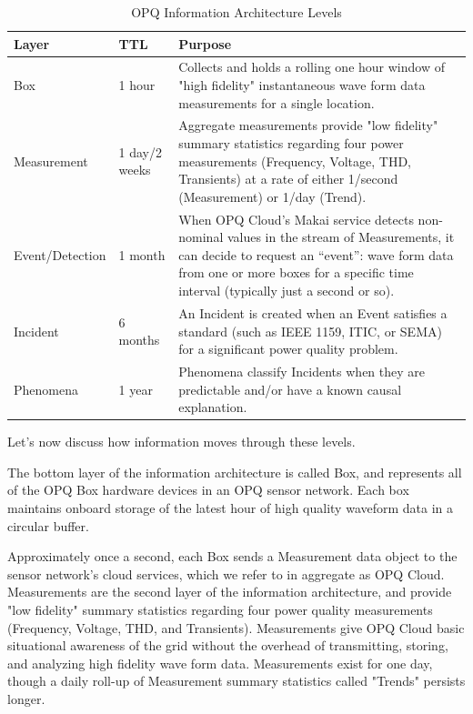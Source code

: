 \begin{table}[ht]
\caption{OPQ Information Architecture Levels}
\centering
\begin{tabular}{llp{4in}}
\toprule
\textbf{Layer}	& \textbf{TTL}	& \textbf{Purpose}\\
\midrule
Box		& 1 hour			& Collects and holds a rolling one hour window of "high fidelity" instantaneous wave form data measurements for a single location.\\
Measurement		& 1 day/2 weeks		& Aggregate measurements provide "low fidelity" summary statistics regarding four power measurements (Frequency, Voltage, THD, Transients) at a rate of either 1/second (Measurement) or 1/day (Trend). \\
Event/Detection & 1 month & When OPQ Cloud's Makai service detects non-nominal values in the stream of Measurements, it can decide to request an ``event'': wave form data from one or more boxes for a specific time interval (typically just a second or so). \\
Incident & 6 months & An Incident is created when an Event satisfies a standard (such as IEEE 1159, ITIC, or SEMA) for a significant power quality problem.\\
Phenomena & 1 year & Phenomena classify Incidents when they are predictable and/or have a known causal explanation. \\
\bottomrule
\end{tabular}
\label{fig:information-architecture}
\end{table}

Let's now discuss how information moves through these levels.

The bottom layer of the information architecture is called Box, and represents all of the OPQ Box hardware devices in an OPQ sensor network. Each box maintains onboard storage of the latest hour of high quality waveform data in a circular buffer.

Approximately once a second, each Box sends a Measurement data object to the sensor network's cloud services, which we refer to in aggregate as OPQ Cloud. Measurements are the second layer of the information architecture, and provide "low fidelity" summary statistics regarding four power quality measurements (Frequency, Voltage, THD, and Transients). Measurements give OPQ Cloud basic situational awareness of the grid without the overhead of transmitting, storing, and analyzing high fidelity wave form data. Measurements exist for one day, though a daily roll-up of Measurement summary statistics called "Trends" persists longer.

